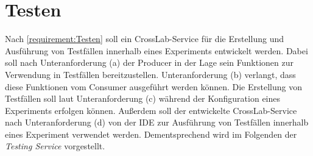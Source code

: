 \section{Testen}\label{section:konzeption:testen}


Nach \autoref{requirement:Testen} soll ein CrossLab-Service für die Erstellung und Ausführung von Testfällen innerhalb eines Experiments entwickelt werden. Dabei soll nach Unteranforderung (a) der Producer in der Lage sein Funktionen zur Verwendung in Testfällen bereitzustellen. Unteranforderung (b) verlangt, dass diese Funktionen vom Consumer ausgeführt werden können. Die Erstellung von Testfällen soll laut Unteranforderung (c) während der Konfiguration eines Experiments erfolgen können. Außerdem soll der entwickelte CrossLab-Service nach Unteranforderung (d) von der IDE zur Ausführung von Testfällen innerhalb eines Experiment verwendet werden. Dementsprechend wird im Folgenden der \textit{Testing Service} vorgestellt.

